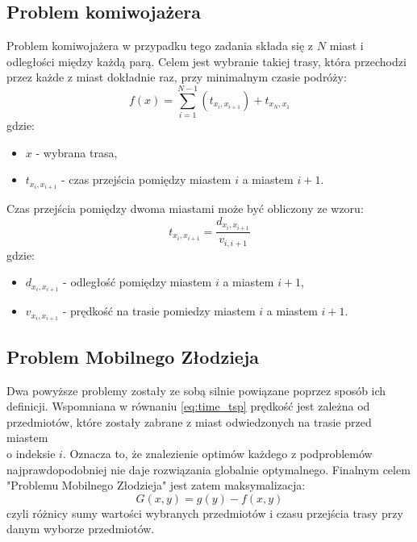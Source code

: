 \documentclass{article}
\begin{document}
	\subsection{Problem komiwojażera}
	Problem komiwojażera w przypadku tego zadania składa się z ${N}$ miast i odległości między każdą parą. Celem jest wybranie takiej trasy, która przechodzi przez każde z miast dokładnie raz, przy minimalnym czasie podróży:
	\begin{equation}\label{eq:min_tsp}
		f(x) = \sum\limits_{i=1}^{N-1}(t_{x_{i},x_{i+1}}) + t_{x_{N},x_{1}}
	\end{equation}
	gdzie: 
	\begin{itemize}
		\item $x$ - wybrana trasa,
		\item $t_{x_{i},x_{i+1}}$ - czas przejścia pomiędzy miastem $i$ a miastem $i+1$.
	\end{itemize}
	Czas przejścia pomiędzy dwoma miastami może być obliczony ze wzoru:
	\begin{equation}\label{eq:time_tsp}
		t_{x_{i},x_{i+1}} = \dfrac{d_{x_{i}, x_{i+1}}}{v_{i, i+1}}
	\end{equation}
	gdzie:
	\begin{itemize}
		\item $d_{x_{i},x_{i+1}}$ - odległość pomiędzy miastem $i$ a miastem $i+1$,
		\item $v_{x_{i},x_{i+1}}$ - prędkość na trasie pomiedzy miastem $i$ a miastem $i+1$.
	\end{itemize}
	\subsection{Problem Mobilnego Złodzieja}
	Dwa powyższe problemy zostały ze sobą silnie powiązane poprzez sposób ich definicji. Wspomniana w równaniu \ref{eq:time_tsp} prędkość jest zależna od przedmiotów, które zostały zabrane z miast odwiedzonych na trasie przed miastem \\o indeksie $i$. Oznacza to, że znalezienie optimów każdego z podproblemów najprawdopodobniej nie daje rozwiązania globalnie optymalnego. Finalnym celem "Problemu Mobilnego Złodzieja" jest zatem maksymalizacja:
	\begin{equation}\label{eq:fitness_function}
		G(x, y) = g(y) - f(x, y)
	\end{equation}
	czyli różnicy sumy wartości wybranych przedmiotów i czasu przejścia trasy przy danym wyborze przedmiotów.
	
\end{document}

